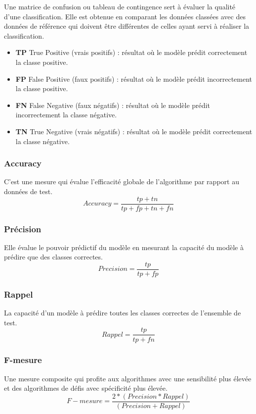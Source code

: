         Une matrice de confusion ou tableau de contingence sert à évaluer la qualité d'une classification. Elle est obtenue en comparant les données classées avec des données de référence qui doivent être différentes de celles ayant servi à réaliser la classification.
        
        \begin{itemize}
            \item{\textbf{TP }True Positive (vrais positifs) :} résultat où le modèle prédit correctement la classe positive.
            \item{\textbf{FP }False Positive (faux positifs) :} résultat où le modèle prédit incorrectement la classe positive.
            \item{\textbf{FN }False Negative (faux négatifs) :} résultat où le modèle prédit incorrectement la classe négative.
            \item{\textbf{TN }True Negative (vrais négatifs) :} résultat où le modèle prédit correctement la classe négative.
        \end{itemize}
        
        \subsubsection{Accuracy} 
        C'est une mesure qui évalue l'efficacité globale de l'algorithme par rapport au données de test.
        \[ Accuracy = \frac{tp+tn} {tp+fp+tn+fn} \]
        \subsubsection{Précision} 
        Elle évalue le pouvoir prédictif du modèle en mesurant la capacité du modèle à prédire que des classes correctes.
        \[ Precision = \frac{tp} {tp+fp} \]
        \subsubsection{Rappel} 
        La capacité d’un modèle à prédire toutes les classes correctes de l'ensemble de test.
        \[ Rappel = \frac{tp} {tp+fn} \]
        \subsubsection{F-mesure}
        Une mesure composite qui profite aux algorithmes avec une sensibilité plus élevée et des algorithmes de défis avec spécificité plus élevée. \label{fmesure}
        \[ F-mesure = \frac{2 * (Precision * Rappel)} {(Precision + Rappel)}\]
        
